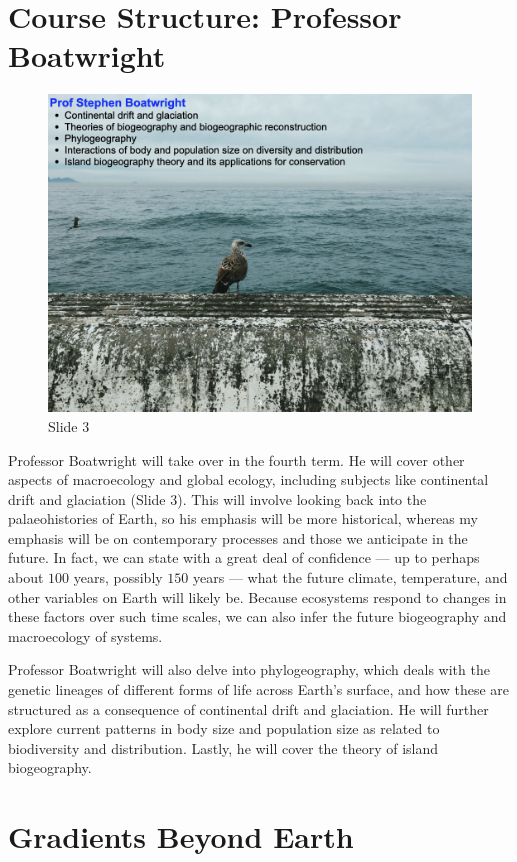 \documentclass[
  11pt,
]{book}
\begin{document}
\section{Course Structure: Professor
Boatwright}\label{course-structure-professor-boatwright}

\begin{figure}[ht]
\centering
\includegraphics[width=0.8\linewidth]{../images/BDC334/BDC334-003.jpeg}
\caption*{Slide 3}
\end{figure}

Professor Boatwright will take over in the fourth term. He will cover
other aspects of macroecology and global ecology, including subjects
like continental drift and glaciation (Slide 3). This will involve
looking back into the palaeohistories of Earth, so his emphasis will be
more historical, whereas my emphasis will be on contemporary processes
and those we anticipate in the future. In fact, we can state with a
great deal of confidence --- up to perhaps about \(100\) years, possibly
\(150\) years --- what the future climate, temperature, and other
variables on Earth will likely be. Because ecosystems respond to changes
in these factors over such time scales, we can also infer the future
biogeography and macroecology of systems.

Professor Boatwright will also delve into phylogeography, which deals
with the genetic lineages of different forms of life across Earth's
surface, and how these are structured as a consequence of continental
drift and glaciation. He will further explore current patterns in body
size and population size as related to biodiversity and distribution.
Lastly, he will cover the theory of island biogeography.

\section{Gradients Beyond Earth}\label{gradients-beyond-earth}
\end{document}
